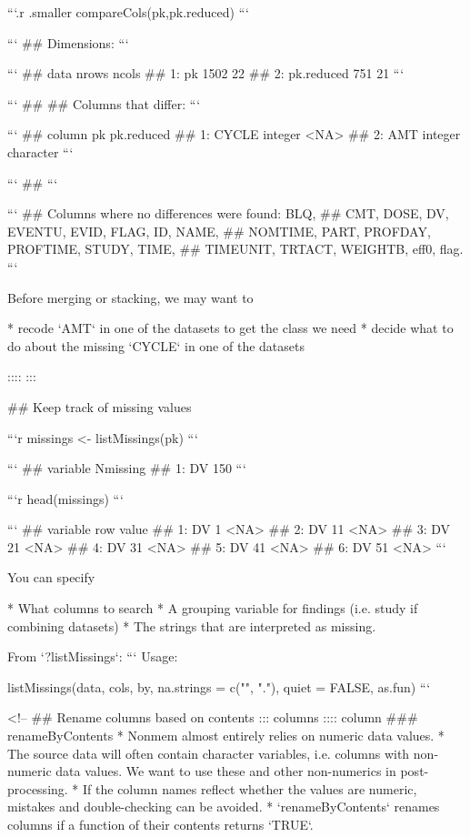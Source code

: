 ```{.r .smaller}
compareCols(pk,pk.reduced)
```

```
## Dimensions:
```

```
##          data nrows ncols
## 1:         pk  1502    22
## 2: pk.reduced   751    21
```

```
## 
## Columns that differ:
```

```
##    column      pk pk.reduced
## 1:  CYCLE integer       <NA>
## 2:    AMT integer  character
```

```
## 
```

```
## Columns where no differences were found: BLQ,
## CMT, DOSE, DV, EVENTU, EVID, FLAG, ID, NAME,
## NOMTIME, PART, PROFDAY, PROFTIME, STUDY, TIME,
## TIMEUNIT, TRTACT, WEIGHTB, eff0, flag.
```


\vspace{12pt}

Before merging or stacking, we may want to 

* recode `AMT` in one of the datasets to get the class we need
* decide what to do about the missing `CYCLE` in one of the datasets 

::::
:::

## Keep track of missing values

```r
missings <- listMissings(pk)
```

```
##    variable Nmissing
## 1:       DV      150
```

```r
head(missings)
```

```
##    variable row value
## 1:       DV   1  <NA>
## 2:       DV  11  <NA>
## 3:       DV  21  <NA>
## 4:       DV  31  <NA>
## 5:       DV  41  <NA>
## 6:       DV  51  <NA>
```

You can specify 

* What columns to search
* A grouping variable for findings (i.e. study if combining datasets) 
* The strings that are interpreted as missing. 

From `?listMissings`:
```
Usage:

     listMissings(data, cols, by, na.strings = c("", "."), quiet = FALSE, as.fun)
```


<!-- %
## Rename columns based on contents
::: columns
:::: column 
### renameByContents
* Nonmem almost entirely relies on numeric data values.
* The source data
will often contain character variables, i.e. columns with non-numeric
data values. We want to use these and other non-numerics in post-processing.
* If the column names reflect whether the values are numeric, mistakes and double-checking can be avoided. 
* `renameByContents` renames columns if a function of their contents returns `TRUE`.

